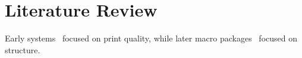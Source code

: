 \chapter{Literature Review}\label{ch:literature}

Early systems~\cite{knuth1984} focused on print quality, while later macro packages~\cite{lamport1994}
focused on structure.




